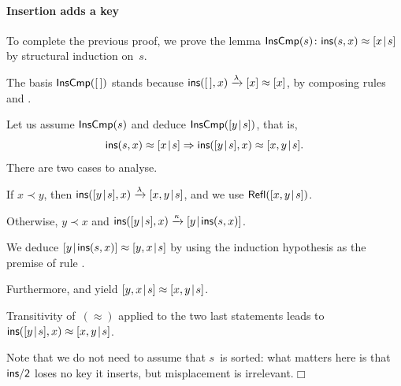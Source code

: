 \paragraph{Insertion adds a key}

To complete the previous proof, we prove the
lemma \(\textsf{InsCmp}({s}) \colon
\textsf{ins}(s,x) \approx [{x}\!\mid\!{s}]\) by structural induction on~\(s\).
\begin{itemize*}

  \item The basis \(\textsf{InsCmp}({[\,]})\) stands because
    \(\textsf{ins}([\,],x) \xrightarrow{\smash{\lambda}} [x] \approx
          [x]\), by composing rules  and .

  \item Let us assume \(\textsf{InsCmp}({s})\) and deduce
    \(\textsf{InsCmp}({[{y}\!\mid\!{s}]})\), that is,
    \begin{equation*}
      \textsf{ins}(s,x) \approx [{x}\!\mid\!{s}] \Rightarrow
      \textsf{ins}([{y}\!\mid\!{s}],x) \approx [{x,y}\!\mid\!{s}].
    \end{equation*}
    There are two cases to analyse.
    \begin{itemize*}

    \item If \(x \prec y\), then \(\textsf{ins}([{y}\!\mid\!{s}],x)
      \xrightarrow{\smash{\lambda}} [{x,y}\!\mid\!{s}]\), and we use
      \(\textsf{Refl}({[{x,y}\!\mid\!{s}]})\).

    \item Otherwise, \(y \prec x\) and \(\textsf{ins}([{y}\!\mid\!{s}],x)
      \xrightarrow{\smash{\kappa}} [{y}\!\mid\!{\textsf{ins}(s,x)}]\).
      \begin{itemize*}

        \item We deduce \([{y}\!\mid\!{\textsf{ins}(s,x)}] \approx
          [{y,x}\!\mid\!{s}]\) by using the induction hypothesis as the
          premise of rule .

        \item Furthermore,  and  yield
          \([{y,x}\!\mid\!{s}] \approx [{x,y}\!\mid\!{s}]\).

        \item Transitivity of~\((\approx)\) applied to the two last
          statements leads to \(\textsf{ins}([{y}\!\mid\!{s}],x) \approx
          [{x,y}\!\mid\!{s}]\).

      \end{itemize*}
      Note that we do not need to assume that \(s\)~is sorted: what
      matters here is that \(\textsf{ins/2}\) loses no key it inserts,
      but misplacement is irrelevant.\hfill\(\Box\)

    \end{itemize*}

\end{itemize*}


